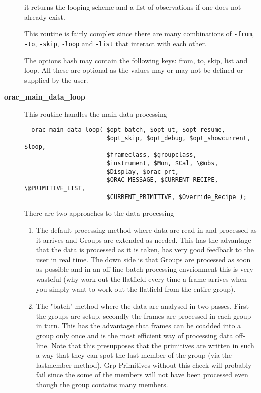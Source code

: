 \begin{description}
it returns the looping scheme and a list of observations if one does not
already exist.



This routine is fairly complex since there are many combinations of
\texttt{-from}, \texttt{-to}, \texttt{-skip}, \texttt{-loop} and \texttt{-list} that interact with
each other.



The options hash may contain the following keys: from, to, skip,
list and loop. All these are optional as the values may or may
not be defined or supplied by the user.


\item[\textbf{orac\_main\_data\_loop}] \mbox{}

This routine handles the main data processing

\begin{verbatim}
  orac_main_data_loop( $opt_batch, $opt_ut, $opt_resume, 
                       $opt_skip, $opt_debug, $opt_showcurrent, $loop, 
                       $frameclass, $groupclass, 
                       $instrument, $Mon, $Cal, \@obs, 
                       $Display, $orac_prt,
                       $ORAC_MESSAGE, $CURRENT_RECIPE, \@PRIMITIVE_LIST,
                       $CURRENT_PRIMITIVE, $Override_Recipe );
\end{verbatim}


There are two approaches to the data processing

\begin{enumerate}

\item 

The default processing method where data are read in and processed as
it arrives and Groups are extended as needed. This has the advantage
that the data is processed as it is taken, has very good feedback to
the user in real time. The down side is that Groups are processed as
soon as possible and in an off-line batch processing envrionment this
is very wasteful (why work out the flatfield every time a frame
arrives when you simply want to work out the flatfield from the entire
group).


\item 

The "batch" method where the data are analysed in two passes.  First
the groups are setup, secondly the frames are processed in each group
in turn. This has the advantage that frames can be coadded into a
group only once and is the most efficient way of processing data
off-line. Note that this presupposes that the primitives are written
in such a way that they can spot the last member of the group (via the
lastmember method). Grp Primitives without this check will probably
fail since the some of the members will not have been processed even
though the group contains many members.




\end{enumerate}
\end{description}
